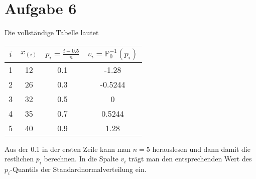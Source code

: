 \documentclass{article}
\begin{document}
	\section*{Aufgabe 6}
	Die vollständige Tabelle lautet
	\begin{center}
		\begin{tabular}{cc|cc}
			$i$ & $x_{(i)}$ & $p_i=\frac{i-0.5}{n}$ & $v_i=\mathbb{P}_0^{-1}(p_i)$ \\
			\hline
			1 & 12 & 0.1 & -1.28 \\
			2 & 26 & 0.3 & -0.5244 \\
			3 & 32 & 0.5 & 0 \\
			4 & 35 & 0.7 & 0.5244 \\
			5 & 40 & 0.9 & 1.28
		\end{tabular}
	\end{center}
	Aus der 0.1 in der ersten Zeile kann man $n=5$ herauslesen und dann damit die restlichen $p_i$ berechnen. In die Spalte $v_i$ trägt man den entsprechenden Wert des $p_i$-Quantils der Standardnormalverteilung ein.
\end{document}
